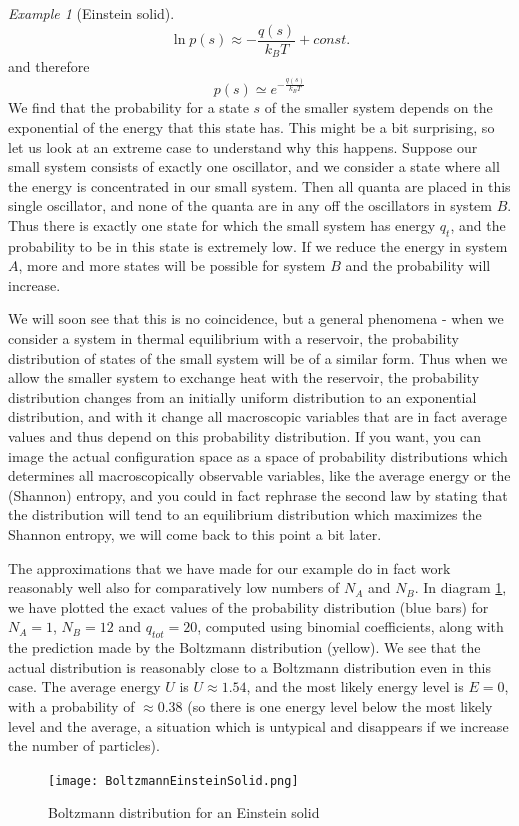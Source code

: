 \documentclass[a4paper, draft]{article}
\theoremstyle{own}
\theoremstyle{remark}
\newtheorem{example}{Example}[section]
\begin{document}
\begin{example}[Einstein solid]
$$
\ln p(s) \approx - \frac{q(s)}{k_B T} + const.
$$ 
and therefore 
$$
p(s) \simeq e^{- \frac{q(s)}{k_B T}}
$$
We find that the probability for a state $s$ of the smaller system depends on the exponential of the energy that this state has. This might be a bit surprising, so let us look at an extreme case to understand why this happens. Suppose our small system consists of exactly one oscillator, and we consider a state where all the energy is concentrated in our small system. Then all quanta are placed in this single oscillator, and none of the quanta are in any off the oscillators in system $B$. Thus there is exactly one state for which the small system has energy $q_t$, and the probability to be in this state is extremely low. If we reduce the energy in system $A$, more and more states will be possible for system $B$ and the probability will increase. 

We will soon see that this is no coincidence, but a general phenomena - when we consider a system in thermal equilibrium with a reservoir, the probability distribution of states of the small system will be of a similar form. Thus when we allow the smaller system to exchange heat with the reservoir, the probability distribution changes from an initially uniform distribution to an exponential distribution, and with it change all macroscopic variables that are in fact average values and thus depend on this probability distribution. If you want, you can image the actual configuration space as a space of probability distributions which determines all macroscopically observable variables, like the average energy or the (Shannon) entropy, and you could in fact rephrase the second law by stating that the distribution will tend to an equilibrium distribution which maximizes the Shannon entropy, we will come back to this point a bit later.


The approximations that we have made for our example do in fact work reasonably well also for comparatively low numbers of $N_A$ and $N_B$. In diagram \ref{fig:BoltzmannEinsteinSolid}, we have plotted the exact values of the probability distribution (blue bars) for $N_A = 1$, $N_B = 12$ and $q_{tot} = 20$, computed using binomial coefficients, along with the prediction made by the Boltzmann distribution (yellow). We see that the actual distribution is reasonably close to a Boltzmann distribution even in this case. The average energy $U$ is $U \approx 1.54$, and the most likely energy level is $E = 0$, with a probability of $\approx 0.38$ (so there is one energy level below the most likely level and the average, a situation which is untypical and disappears if we increase the number of particles).
	
	\begin{figure}[ht]
		\centering
		\texttt{[image: BoltzmannEinsteinSolid.png]}
		\caption{Boltzmann distribution for an Einstein solid}
		\label{fig:BoltzmannEinsteinSolid}
	\end{figure}
	
	
\end{example}
\end{document}
